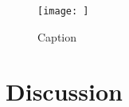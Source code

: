 \documentclass[fleqn,10pt]{wlscirep}
\begin{document}
\begin{figure}
    \centering
    \texttt{[image: ]}
    \caption{Caption}
    \label{proximal_cue_fig}
\end{figure}





\section*{Discussion}
\end{document}

